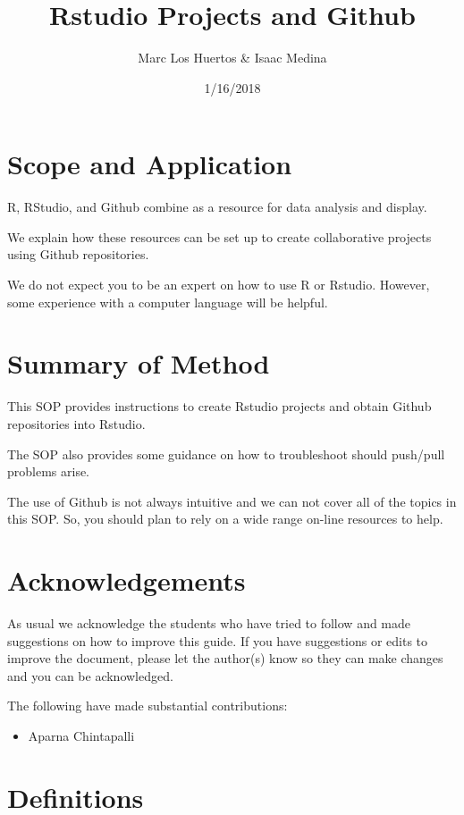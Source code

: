 \documentclass[12pt]{../SOP4_alpha}\usepackage[]{graphicx}\usepackage[]{color}
\author{Marc Los Huertos \& Isaac Medina}
\title{Rstudio Projects and Github}
\date{1/16/2018}
\begin{document}
\maketitle

\section{Scope and Application}

\NP R, RStudio, and Github combine as a resource for data analysis and display.

\NP We explain how these resources can be set up to create collaborative projects using Github repositories. 

\NP We do not expect you to be an expert on how to use R or Rstudio. However, some experience with a computer language will be helpful. 

\section{Summary of Method}

\NP This SOP provides instructions to create Rstudio projects and obtain Github repositories into Rstudio. 

\NP The SOP also provides some guidance on how to troubleshoot should push/pull problems arise.

\NP The use of Github is not always intuitive and we can not cover all of the topics in this SOP. So, you should plan to rely on a wide range on-line resources to help.

\tableofcontents

\newpage

\section{Acknowledgements}

As usual we acknowledge the students who have tried to follow and made suggestions on how to improve this guide. If you have suggestions or edits to improve the document, please let the author(s) know so they can make changes and you can be acknowledged.

The following have made substantial contributions:

\begin{itemize}
\item Aparna Chintapalli
\end{itemize}

\section{Definitions}
\end{document}
